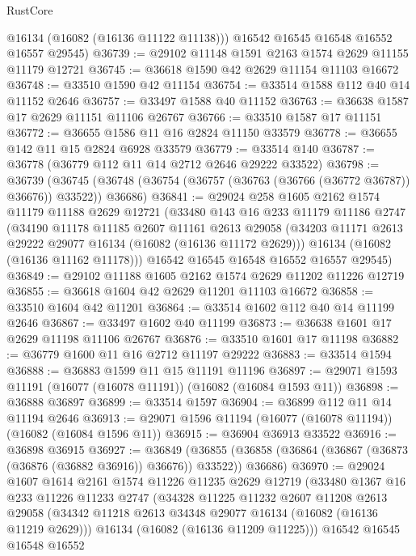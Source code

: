 \begin{lexlean}{RustCore}
\begin{coremodule}
        @16134
        (@16082 (@16136 @11122 @11138)))
      @16542
      @16545
      @16548
      @16552
      @16557
      @29545)
@36739 := @29102 @11148 @1591 @2163 @1574 @2629 @11155 @11179 @12721
@36745 := @36618 @1590 @42 @2629 @11154 @11103 @16672
@36748 := @33510 @1590 @42 @11154
@36754 := @33514 @1588 @112 @40 @14 @11152 @2646
@36757 := @33497 @1588 @40 @11152
@36763 := @36638 @1587 @17 @2629 @11151 @11106 @26767
@36766 := @33510 @1587 @17 @11151
@36772 := @36655 @1586 @11 @16 @2824 @11150 @33579
@36778 := @36655 @142 @11 @15 @2824 @6928 @33579
@36779 := @33514 @140
@36787 := @36778 (@36779 @112 @11 @14 @2712 @2646 @29222 @33522)
@36798 := @36739
    (@36745 (@36748 (@36754 (@36757 (@36763 (@36766 (@36772 @36787)) @36676)) @33522)) @36686)
@36841 := @29024
    @258
    @1605
    @2162
    @1574
    @11179
    @11188
    @2629
    @12721
    (@33480
      @143
      @16
      @233
      @11179
      @11186
      @2747
      (@34190
        @11178
        @11185
        @2607
        @11161
        @2613
        @29058
        (@34203 @11171 @2613 @29222 @29077 @16134 (@16082 (@16136 @11172 @2629)))
        @16134
        (@16082 (@16136 @11162 @11178)))
      @16542
      @16545
      @16548
      @16552
      @16557
      @29545)
@36849 := @29102 @11188 @1605 @2162 @1574 @2629 @11202 @11226 @12719
@36855 := @36618 @1604 @42 @2629 @11201 @11103 @16672
@36858 := @33510 @1604 @42 @11201
@36864 := @33514 @1602 @112 @40 @14 @11199 @2646
@36867 := @33497 @1602 @40 @11199
@36873 := @36638 @1601 @17 @2629 @11198 @11106 @26767
@36876 := @33510 @1601 @17 @11198
@36882 := @36779 @1600 @11 @16 @2712 @11197 @29222
@36883 := @33514 @1594
@36888 := @36883 @1599 @11 @15 @11191 @11196
@36897 := @29071 @1593 @11191 (@16077 (@16078 @11191)) (@16082 (@16084 @1593 @11))
@36898 := @36888 @36897
@36899 := @33514 @1597
@36904 := @36899 @112 @11 @14 @11194 @2646
@36913 := @29071 @1596 @11194 (@16077 (@16078 @11194)) (@16082 (@16084 @1596 @11))
@36915 := @36904 @36913 @33522
@36916 := @36898 @36915
@36927 := @36849
    (@36855 (@36858 (@36864 (@36867 (@36873 (@36876 (@36882 @36916)) @36676)) @33522)) @36686)
@36970 := @29024
    @1607
    @1614
    @2161
    @1574
    @11226
    @11235
    @2629
    @12719
    (@33480
      @1367
      @16
      @233
      @11226
      @11233
      @2747
      (@34328
        @11225
        @11232
        @2607
        @11208
        @2613
        @29058
        (@34342 @11218 @2613 @34348 @29077 @16134 (@16082 (@16136 @11219 @2629)))
        @16134
        (@16082 (@16136 @11209 @11225)))
      @16542
      @16545
      @16548
      @16552

\end{coremodule}
\end{lexlean}

